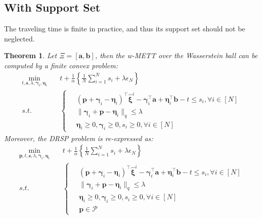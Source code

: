 \documentclass{article}
\newtheorem{thm}{Theorem}
\begin{document}
\subsection{With Support Set}

The traveling time is finite in practice, and thus its support set should not be neglected. 

\begin{thm}
	Let $\Xi = [\bm{a}, \bm{b}]$, then the w-METT over the Wasserstein ball can be computed by a finite convex problem:
	\begin{align}
		\min_{t, \bm{s}, \lambda, \bm{\gamma}_i, \bm{\eta}_i} \quad & t + \frac{1}{\alpha} \left\{\frac{1}{N} \sum_{i=1}^{N} s_i + \lambda \epsilon_N\right\}  \\
		s.t. \quad & \left\{
		\begin{aligned}
			\ & (\bm{p} + \bm{\gamma}_i - \bm{\eta}_i)^\top \hat{\bm{\xi}}^i - \bm{\gamma}_i^\top \bm{a} + \bm{\eta}_i^\top \bm{b} - t \leq s_i, \forall i \in [N] \\
			& \|\bm{\gamma}_i + \bm{p} - \bm{\eta}_i \|_q \leq \lambda \\
			& \bm{\eta}_i \geq 0, \bm{\gamma}_i \geq 0, s_i \geq 0, \forall i \in [N]
		\end{aligned} \right. 
	\end{align}
	Moreover, the DRSP problem is re-expressed as:
	\begin{align}
		\min_{\bm{p}, t, \bm{s}, \lambda, \bm{\gamma}_i, \bm{\eta}_i} \quad & t + \frac{1}{\alpha} \left\{\frac{1}{N} \sum_{i=1}^{N} s_i + \lambda \epsilon_N\right\} \\
		s.t. \quad & \left\{
		\begin{aligned}
			\ & (\bm{p} + \bm{\gamma}_i - \bm{\eta}_i)^\top \hat{\bm{\xi}}^i - \bm{\gamma}_i^\top \bm{a} + \bm{\eta}_i^\top \bm{b} - t \leq s_i, \forall i \in [N] \\
			& \|\bm{\gamma}_i + \bm{p} - \bm{\eta}_i \|_q \leq \lambda \\
			& \bm{\eta}_i \geq 0, \bm{\gamma}_i \geq 0, s_i \geq 0, \forall i \in [N] \\
			& \bm{p} \in \mathcal{P}
		\end{aligned} \right.
	\end{align}
\end{thm}
\end{document}
